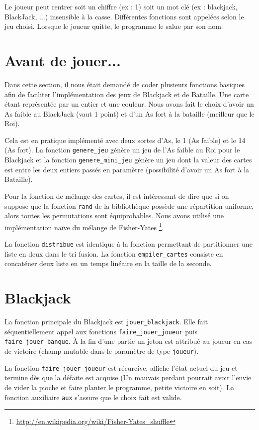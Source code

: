 \documentclass[a4paper]{article}
\begin{document}
  Le joueur peut rentrer soit un chiffre (ex : 1) soit un mot clé (ex : blackjack, BlackJack, ...) insensible à la casse. Différentes fonctions sont appelées selon le jeu choisi. Lorsque le joueur quitte, le programme le salue par son nom.
  
  \section{Avant de jouer...}

  Dans cette section, il nous était demandé de coder plusieurs fonctions basiques afin de faciliter l'implémentation des jeux de Blackjack et de Bataille. Une carte étant représentée par un entier et une couleur. Nous avons fait le choix d'avoir un As faible au BlackJack (vaut 1 point) et d'un As fort à la bataille (meilleur que le Roi).

  Cela est en pratique implémenté avec deux sortes d'As, le 1 (As faible) et le 14 (As fort). La fonction \verb|genere_jeu| génère un jeu de l'As faible au Roi pour le Blackjack et la fonction \verb|genere_mini_jeu| génère un jeu dont la valeur des cartes est entre les deux entiers passés en paramètre (possibilité d'avoir un As fort à la Bataille).

  Pour la fonction de mélange des cartes, il est intéressant de dire que si on suppose que la fonction \verb|rand| de la bibliothèque possède une répartition uniforme, alors toutes les permutations sont équiprobables. Nous avons utilisé une implémentation naïve du mélange de Fisher-Yates \footnote{\url{http://en.wikipedia.org/wiki/Fisher-Yates_shuffle}}.

  La fonction \verb|distribue| est identique à la fonction permettant de partitionner une liste en deux dans le tri fusion. La fonction \verb|empiler_cartes| consiste en concaténer deux liste en un temps linéaire en la taille de la seconde.
  
  \section{Blackjack}

  La fonction principale du Blackjack est \verb|jouer_blackjack|. Elle fait séquentiellement appel aux fonctions \verb|faire_jouer_joueur| puis \verb|faire_jouer_banque|. À la fin d'une partie un jeton est attribué au joueur en cas de victoire (champ mutable dans le paramètre de type \verb|joueur|).
  
  La fonction \verb|faire_jouer_joueur| est récurcive, affiche l'état actuel du jeu et termine dès que la défaite est acquise (Un mauvais perdant pourrait avoir l'envie de vider la pioche et faire planter le programme, petite victoire en soit). La fonction auxiliaire \verb|aux| s'assure que le choix fait est valide.
\end{document}
